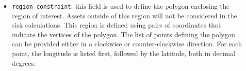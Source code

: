 \begin{itemize}

	\item \Verb+region_constraint+: this field is used to define the polygon
	enclosing the region of interest. Assets outside of this region will not
	be considered in the risk calculations. This region is defined using pairs
	of coordinates that indicate the vertices of the polygon. The list of
	points defining the polygon can be provided either in a clockwise or
	counter-clockwise direction. For each point, the longitude is listed first,
	followed by the latitude, both in decimal degrees.

\end{itemize}